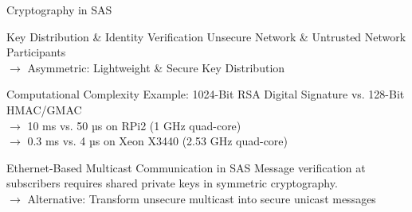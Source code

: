 \documentclass[en]{sdqbeamer}
\begin{document}
\begin{frame}{Cryptography in SAS}
    \begin{blueblock}{Key Distribution \& Identity Verification}
        Unsecure Network \& Untrusted Network Participants
        \\$\rightarrow$ Asymmetric: Lightweight \& Secure Key Distribution
    \end{blueblock}
    \begin{blueblock}{Computational Complexity \parencite{Elbez2019,Ishchenko2018}}
        Example: 1024-Bit RSA Digital Signature vs. 128-Bit HMAC/GMAC
        \\$\rightarrow$ 10 ms vs. 50 µs on RPi2 (1 GHz quad-core)
        \\$\rightarrow$ 0.3 ms vs. 4 µs on Xeon X3440 (2.53 GHz quad-core) 
    \end{blueblock}
    \begin{blueblock}{Ethernet-Based Multicast Communication in SAS}
        Message verification at subscribers requires shared private keys in symmetric cryptography.
        \\$\rightarrow$ Alternative: Transform unsecure multicast into secure unicast messages
    \end{blueblock}
\end{frame}
\end{document}
